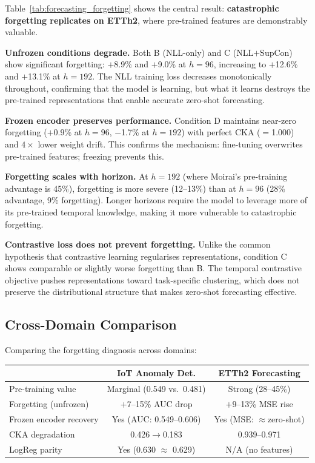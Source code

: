 

Table~\ref{tab:forecasting_forgetting} shows the central result:
\textbf{catastrophic forgetting replicates on ETTh2}, where pre-trained
features are demonstrably valuable.

\textbf{Unfrozen conditions degrade.}
Both B (NLL-only) and C (NLL$+$SupCon) show significant forgetting:
$+$8.9\% and $+$9.0\% at $h{=}96$, increasing to $+$12.6\% and
$+$13.1\% at $h{=}192$.
The NLL training loss decreases monotonically throughout, confirming
that the model is learning, but what it learns destroys the pre-trained
representations that enable accurate zero-shot forecasting.

\textbf{Frozen encoder preserves performance.}
Condition D maintains near-zero forgetting ($+$0.9\% at $h{=}96$,
$-$1.7\% at $h{=}192$) with perfect CKA ($=$1.000) and $4\times$
lower weight drift.
This confirms the mechanism: fine-tuning overwrites pre-trained features;
freezing prevents this.

\textbf{Forgetting scales with horizon.}
At $h{=}192$ (where Moirai's pre-training advantage is 45\%), forgetting
is more severe (12--13\%) than at $h{=}96$ (28\% advantage, 9\% forgetting).
Longer horizons require the model to leverage more of its pre-trained
temporal knowledge, making it more vulnerable to catastrophic forgetting.

\textbf{Contrastive loss does not prevent forgetting.}
Unlike the common hypothesis that contrastive learning regularises
representations, condition C shows comparable or slightly worse
forgetting than B.
The temporal contrastive objective pushes representations toward
task-specific clustering, which does not preserve the distributional
structure that makes zero-shot forecasting effective.

\subsection{Cross-Domain Comparison}
\label{sec:forecasting:comparison}

Comparing the forgetting diagnosis across domains:

\begin{center}
\small
\begin{tabular}{lcc}
\toprule
& IoT Anomaly Det. & ETTh2 Forecasting \\
\midrule
Pre-training value        & Marginal (0.549 vs.\ 0.481) & Strong (28--45\%) \\
Forgetting (unfrozen)     & $+$7--15\% AUC drop & $+$9--13\% MSE rise \\
Frozen encoder recovery   & Yes (AUC: 0.549--0.606) & Yes (MSE: $\approx$zero-shot) \\
CKA degradation           & 0.426$\to$0.183 & 0.939--0.971 \\
LogReg parity             & Yes (0.630 $\approx$ 0.629) & N/A (no features) \\
\bottomrule
\end{tabular}
\end{center}

